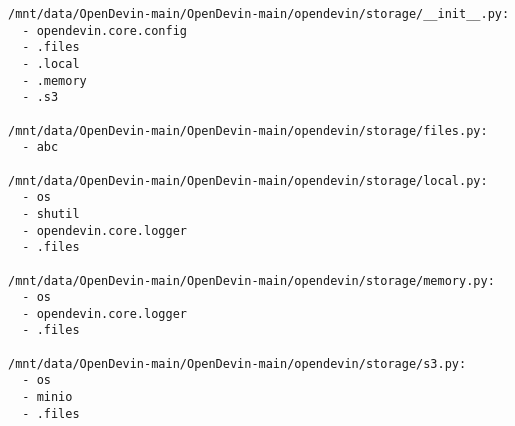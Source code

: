 \documentclass{article}
\begin{document}
\begin{verbatim}
/mnt/data/OpenDevin-main/OpenDevin-main/opendevin/storage/__init__.py:
  - opendevin.core.config
  - .files
  - .local
  - .memory
  - .s3

/mnt/data/OpenDevin-main/OpenDevin-main/opendevin/storage/files.py:
  - abc

/mnt/data/OpenDevin-main/OpenDevin-main/opendevin/storage/local.py:
  - os
  - shutil
  - opendevin.core.logger
  - .files

/mnt/data/OpenDevin-main/OpenDevin-main/opendevin/storage/memory.py:
  - os
  - opendevin.core.logger
  - .files

/mnt/data/OpenDevin-main/OpenDevin-main/opendevin/storage/s3.py:
  - os
  - minio
  - .files


\end{verbatim}
\end{document}
